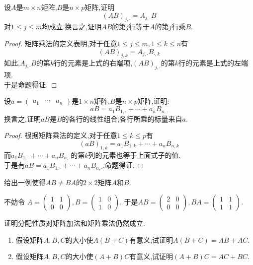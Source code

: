 \documentclass{ctexart}
\begin{document}
\begin{problem}[8.]
    设$A$是$m\times n$矩阵,$B$是$n\times p$矩阵,证明
    $$(AB)_{j,\cdot}=A_{j,\cdot}B$$
    对$1\leqslant j\leqslant m$均成立.换言之,证明$AB$的第$j$行等于$A$的第$j$行乘$B$.
\end{problem}
\begin{proof}
    矩阵乘法的定义表明,对于任意$1\leqslant j\leqslant m,1\leqslant k\leqslant n$有
    $$(AB)_{j,k}=A_{j,\cdot}B_{\cdot,k}$$
    如此,$A_{j,\cdot}B$的第$k$行的元素是上式的右端项,$(AB)_{j,\cdot}$的第$k$行的元素是上式的左端项.\\
    于是命题得证.
\end{proof}
\begin{problem}[9.]
    设$a=\begin{pmatrix}
        a_1 & \cdots & a_n
    \end{pmatrix}$是$1\times n$矩阵,$B$是$n\times p$矩阵,证明:
    $$aB=a_1B_{1,\cdot}+\cdots+a_nB_{n,\cdot}$$
    换言之,证明$aB$是$B$的各行的线性组合,各行所乘的标量来自$a$.
\end{problem}
\begin{proof}
    根据矩阵乘法的定义,对于任意$1\leqslant k\leqslant p$有
    $$(aB)_{1,k}=a_1B_{1,k}+\cdots+a_nB_{n,k}$$
    而$a_1B_{1,\cdot}+\cdots+a_nB_{n,\cdot}$的第$k$列的元素也等于上面式子的值.\\
    于是有$aB=a_1B_{1,\cdot}+\cdots+a_nB_{n,\cdot}$,命题得证.
\end{proof}
\begin{problem}[10.]
    给出一例使得$AB\neq BA$的$2\times 2$矩阵$A$和$B$.
\end{problem}
\begin{solution}[Solution.]
    不妨令
    $A=\begin{pmatrix}1 & 1 \\ 0 & 0\end{pmatrix},
    B=\begin{pmatrix}1 & 0 \\ 1 & 0\end{pmatrix}$.
    于是$AB=\begin{pmatrix}2 & 0 \\ 0 & 0\end{pmatrix},
    BA=\begin{pmatrix}1 & 1 \\ 1 & 1\end{pmatrix}$.
\end{solution}
\begin{problem}[11.]
    证明分配性质对矩阵加法和矩阵乘法仍然成立.
    \begin{enumerate}[label=\tbf{(\arabic*)}]
        \item 假设矩阵$A,B,C$的大小使$A(B+C)$有意义,试证明$A(B+C)=AB+AC$.
        \item 假设矩阵$A,B,C$的大小使$(A+B)C$有意义,试证明$(A+B)C=AC+BC$.
    \end{enumerate}
\end{problem}
\end{document}
